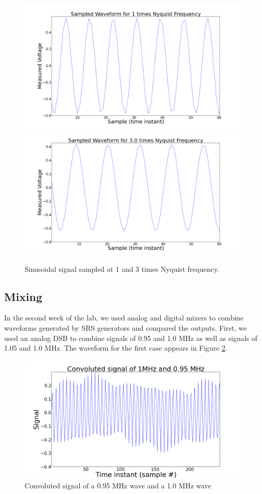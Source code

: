 \documentclass[11pt]{article}
\begin{document}
\begin{figure}
\centering
\includegraphics[scale=0.35]{pictures/onetimesnyq}
\includegraphics[scale=0.35]{pictures/triplenyq}
\caption{Sinusoidal signal sampled at 1 and 3
  times Nyquist frequency. \label{nyqg}}
\end{figure}
\subsection{Mixing}

In the second week of the lab, we used analog and digital mixers to combine waveforms generated by SRS generators and compared the outputs. First, we used an analog DSB to combine signals of 0.95 and 1.0 MHz as well as signals of 1.05 and 1.0 MHz. The waveform for the first case appears in Figure \ref{wavenine}. 

\begin{figure}
\includegraphics[scale=0.45]{pictures/signalninefive}
\caption{Convoluted signal of a 0.95 MHz wave and a 1.0 MHz wave \label{wavenine}}
\end{figure}
\end{document}

